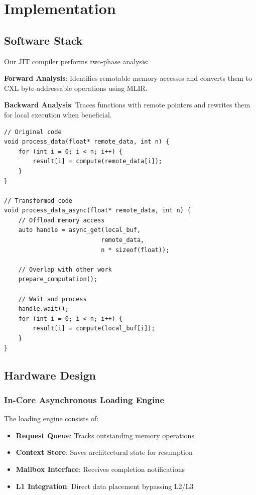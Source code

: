 \documentclass[10pt,conference]{IEEEtran}
\begin{document}
\section{Implementation}

\subsection{Software Stack}

Our JIT compiler performs two-phase analysis:

\textbf{Forward Analysis}: Identifies remotable memory accesses and converts them to CXL byte-addressable operations using MLIR.

\textbf{Backward Analysis}: Traces functions with remote pointers and rewrites them for local execution when beneficial.

\begin{lstlisting}[caption={Example of JIT transformation},label={lst:jit}]
// Original code
void process_data(float* remote_data, int n) {
    for (int i = 0; i < n; i++) {
        result[i] = compute(remote_data[i]);
    }
}

// Transformed code
void process_data_async(float* remote_data, int n) {
    // Offload memory access
    auto handle = async_get(local_buf, 
                           remote_data, 
                           n * sizeof(float));
    
    // Overlap with other work
    prepare_computation();
    
    // Wait and process
    handle.wait();
    for (int i = 0; i < n; i++) {
        result[i] = compute(local_buf[i]);
    }
}
\end{lstlisting}

\subsection{Hardware Design}

\subsubsection{In-Core Asynchronous Loading Engine}

The loading engine consists of:
\begin{itemize}
    \item \textbf{Request Queue}: Tracks outstanding memory operations
    \item \textbf{Context Store}: Saves architectural state for resumption
    \item \textbf{Mailbox Interface}: Receives completion notifications
    \item \textbf{L1 Integration}: Direct data placement bypassing L2/L3
\end{itemize}
\end{document}
